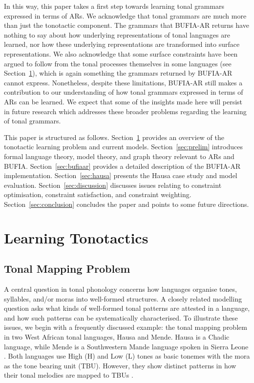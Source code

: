 \documentclass{CUP-JNL-PHO}%
\theoremstyle{definition}
\numberwithin{equation}{section}
\theoremstyle{definition}
\begin{document}
In this way, this paper takes a first step towards learning tonal
grammars expressed in terms of ARs. We acknowledge that tonal grammars
are much more than just the tonotactic component. The grammars that
BUFIA-AR returns have nothing to say about how underlying
representations of tonal languages are learned, nor how these
underlying representations are transformed into surface
representations. We also acknowledge that some surface constraints
have been argued to follow from the tonal processes themselves in some
languages (see Section~\ref{sec:learning}), which is again something
the grammars returned by BUFIA-AR cannot express. Nonetheless, despite
these limitations, BUFIA-AR still makes a contribution to our
understanding of how tonal grammars expressed in terms of ARs can be
learned. We expect that some of the insights made here will persist in
future research which addresses these broader problems regarding the
learning of tonal grammars.

This paper is structured as follows. Section~\ref{sec:learning}
provides an overview of the tonotactic learning problem and current models. Section~\ref{sec:prelim} introduces 
formal language theory, model theory, and graph theory relevant to ARs
and BUFIA. Section~\ref{sec:bufiaar} provides a detailed description
of the BUFIA-AR implementation. Section~\ref{sec:hausa} presents the Hausa case study and model evaluation. Section~\ref{sec:discussion}
discusses issues relating to constraint optimisation, constraint
satisfaction, and constraint weighting. Section~\ref{sec:conclusion}
concludes the paper and points to some future directions.


\section{Learning Tonotactics} \label{sec:learning}
\subsection{Tonal Mapping Problem}\label{sec:learning.mapping}

A central question in tonal phonology concerns how languages organise 
tones, syllables, and/or moras into well-formed structures. A 
closely related modelling question asks what kinds of well-formed 
tonal patterns are attested in a language, and how such patterns 
can be systematically characterised. To illustrate these issues, 
we begin with a frequently discussed example: the tonal mapping 
problem in two West African tonal languages, Hausa and Mende. 
Hausa is a Chadic language, while Mende is a Southwestern Mande 
language spoken in Sierra Leone \citep{lebenRepresentationTone1978}.
Both languages use High (H) and
Low (L) tones as basic tonemes with the mora as the tone bearing unit
(TBU). However, they show distinct patterns in how their tonal
melodies are mapped to TBUs \citep{Newmanbook,
	lebenRepresentationTone1978, zoll2003optimal, jardine2017LocalNature}.  
\end{document}
